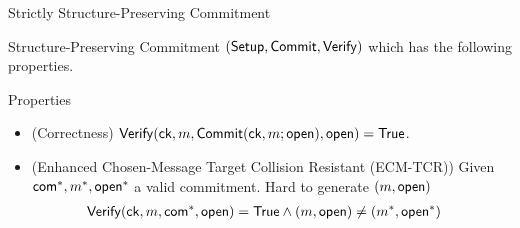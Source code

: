\begin{frame}{Strictly Structure-Preserving Commitment~\cite{DBLP:conf/eurocrypt/AbeKOT15}}

	Structure-Preserving Commitment $({\mathsf{Setup}}, {\mathsf{Commit}}, {\mathsf{Verify}})$ which has the following properties.\pause
  \begin{block}{Properties}
    \begin{itemize}
    \item {\color{blue}(Correctness)} ${\mathsf{Verify}}(\mathsf{ck}, m, {\mathsf{Commit}}(\mathsf{ck}, m; \mathsf{open}), \mathsf{open}) = \mathsf{True}$.
      \pause
    \item {\color{blue}(Enhanced Chosen-Message Target Collision Resistant (ECM-TCR))} Given $\mathsf{com}^*, m^*, \mathsf{open}^*$ a valid commitment. Hard to generate $(m, \mathsf{open})$ \st
      \begin{align*}
        {\mathsf{Verify}}(\mathsf{ck}, m, \mathsf{com}^*, \mathsf{open}) &= \mathsf{True} \wedge (m, \mathsf{open}) \neq (m^*, \mathsf{open}^*)
      \end{align*}
    \end{itemize}
  \end{block}


\end{frame}


